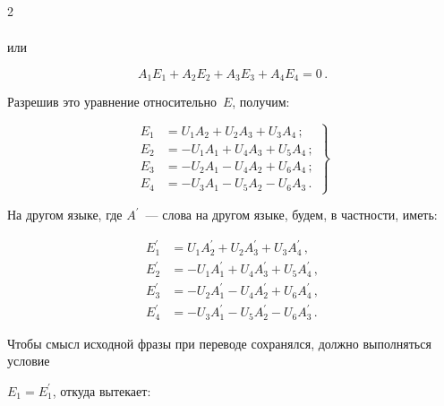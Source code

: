 \begin{multicols}{2}
\begin{multline*}
\end{multline*}


или


      $$


      A_1E_1 + A_2E_2 + A_3E_3 + A_4E_4 = 0\,.


$$


Разрешив это уравнение относительно~$E$, получим:


\begin{equation}


\left.


\begin{array}{rl}


     E_1 &=U_1A_2+U_2A_3+U_3A_4\,;\\[6pt]


     E_2 &= -U_1A_1+U_4A_3+U_5A_4\,;\\[6pt]


     E_3 &= -U_2A_1-U_4A_2+U_6A_4\,;\\[6pt]


     E_4 &= -U_3A_1-U_5A_2-U_6A_3\,.


     \end{array}


     \right\}


     \label{e7-ign}


     \end{equation}


На другом языке, где $A^\prime$~--- слова на другом языке, будем, в частности, иметь:


\begin{align*}


E_1^\prime &=U_1 A_2^\prime+U_2A_3^\prime+U_3A_4^\prime\,,\\


E_2^\prime &= -U_1A_1^\prime+U_4A_3^\prime +U_5A_4^\prime\,,\\


     E_3^\prime &= -U_2A_1^\prime -U_4A_2^\prime 


+U_6A_4^\prime\,,\\


     E_4^\prime &= -U_3A_1^\prime -U_5A_2^\prime -


U_6A_3^\prime\,.




     \end{align*}


Чтобы смысл исходной фразы при переводе сохранялся, должно выполняться условие 


$E_1=E_1^\prime$, откуда вытекает:



\end{multicols}
